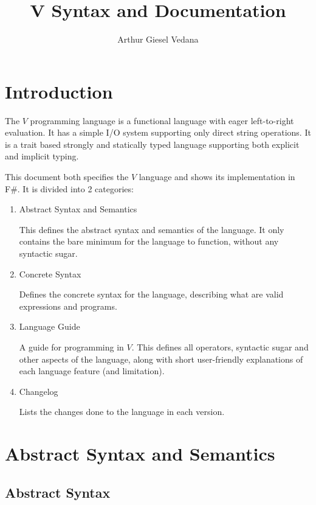 \documentclass{article}
\author{Arthur Giesel Vedana}
\title{V Syntax and Documentation}
\begin{document}
\maketitle
{}
\newpage

\tableofcontents
\newpage

\section*{Introduction}
The $V$ programming language is a functional language with eager left-to-right evaluation.
It has a simple I/O system supporting only direct string operations.
It is a trait based strongly and statically typed language supporting both explicit and implicit typing.


This document both specifies the $V$ language and shows its implementation in F\#.
It is divided into 2 categories:
\begin{enumerate}
    \item Abstract Syntax and Semantics

        This defines the abstract syntax and semantics of the language.
        It only contains the bare minimum for the language to function, without any syntactic sugar.

    \item Concrete Syntax

        Defines the concrete syntax for the language, describing what are valid expressions and programs.

    \item Language Guide

        A guide for programming in $V$.
        This defines all operators, syntactic sugar and other aspects of the language, along with short user-friendly explanations of each language feature (and limitation).

    \item Changelog

         Lists the changes done to the language in each version.
\end{enumerate}

\newpage
{}
\section{Abstract Syntax and Semantics}

\subsection{Abstract Syntax}
\end{document}
